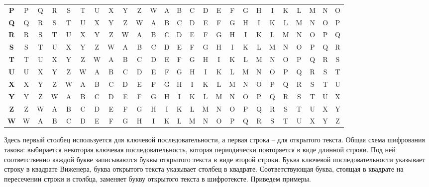 \begin{center}
{\begin{tabular}{|c|*{24}c|}
    \textbf{P} & P & Q & R & S & T & U & X & Y & Z & W & A & B & C & D & E & F & G & H & I & K & L & M & N & O \\
    \textbf{Q} & Q & R & S & T & U & X & Y & Z & W & A & B & C & D & E & F & G & H & I & K & L & M & N & O & P \\
    \textbf{R} & R & S & T & U & X & Y & Z & W & A & B & C & D & E & F & G & H & I & K & L & M & N & O & P & Q \\
    \textbf{S} & S & T & U & X & Y & Z & W & A & B & C & D & E & F & G & H & I & K & L & M & N & O & P & Q & R \\
    \textbf{T} & T & U & X & Y & Z & W & A & B & C & D & E & F & G & H & I & K & L & M & N & O & P & Q & R & S \\
    \textbf{U} & U & X & Y & Z & W & A & B & C & D & E & F & G & H & I & K & L & M & N & O & P & Q & R & S & T \\
    \textbf{X} & X & Y & Z & W & A & B & C & D & E & F & G & H & I & K & L & M & N & O & P & Q & R & S & T & U \\
    \textbf{Y} & Y & Z & W & A & B & C & D & E & F & G & H & I & K & L & M & N & O & P & Q & R & S & T & U & X \\
    \textbf{Z} & Z & W & A & B & C & D & E & F & G & H & I & K & L & M & N & O & P & Q & R & S & T & U & X & Y \\
    \textbf{W} & W & A & B & C & D & E & F & G & H & I & K & L & M & N & O & P & Q & R & S & T & U & X & Y & Z \\
    \hline
\end{tabular} } \end{center}

Здесь первый столбец используется для ключевой последовательности, а первая строка -- для открытого текста. Общая схема шифрования такова: выбирается некоторая ключевая последовательность, которая периодически повторяется в виде длинной строки. Под ней соответственно каждой букве записываются буквы открытого текста в виде второй строки. Буква ключевой последовательности указывает строку в квадрате Виженера, буква открытого текста указывает столбец в квадрате. Соответствующая буква, стоящая в квадрате на пересечении строки и столбца, заменяет букву открытого текста в шифротексте. Приведем примеры.

